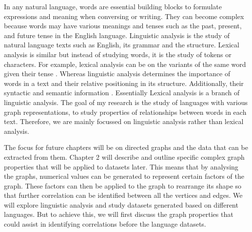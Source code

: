 In any natural language, words are essential building blocks to formulate expressions and meaning when conversing or writing. They can become complex because words may have various meanings and tenses such as the past, present, and future tense in the English language. Linguistic analysis is the study of natural language texts such as English, its grammar and the structure. Lexical analysis is similar but instead of studying words, it is the study of tokens or characters. For example, lexical analysis can be on the variants of the same word given their tense \cite{hippisley2010lexical}. Whereas linguistic analysis determines the importance of words in a text and their relative positioning in its structure. Additionally, their syntactic and semantic information \cite{broekman2021linguistic}. Essentially Lexical analysis is a branch of linguistic analysis. The goal of my research is the study of languages with various graph representations, to study properties of relationships between words in each text. Therefore, we are mainly focussed on linguistic analysis rather than lexical analysis.

The focus for future chapters will be on directed graphs and the data that can be extracted from them. Chapter 2 will describe and outline specific complex graph properties that will be applied to datasets later. This means that by analysing the graphs, numerical values can be generated to represent certain factors of the graph. These factors can then be applied to the graph to rearrange its shape so that further correlation can be identified between all the vertices and edges. We will explore linguistic analysis and study datasets generated based on different languages. But to achieve this, we will first discuss the graph properties that could assist in identifying correlations before the language datasets.